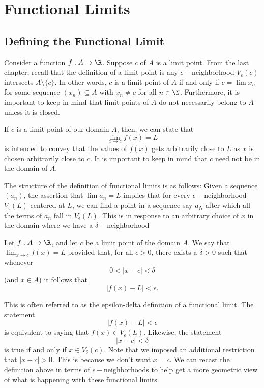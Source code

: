 \section{Functional Limits}


\subsection{Defining the Functional Limit}
Consider a function \( f: A \to \R  \). Suppose \( c  \) of \( A  \) is a limit point. From the last chapter, recall that the definition of a limit point is any \( \epsilon - \)neighborhood \( V_{\epsilon }(c) \) intersects \( A \setminus \{ c \}  \). In other words, \( c  \) is a limit point of \(  A \) if and only if \( c = \lim x_n \) for some sequence \( (x_n) \subseteq A  \) with \( x_n \neq c  \) for all \( n \in \N  \). Furthermore, it is important to keep in mind that limit points of \(  A \) do not necessarily belong to \( A  \) unless it is closed. 

If \( c  \) is a limit point of our domain \( A  \), then, we can state that 
\[ \lim_{x \to c }f(x) = L  \] is intended to convey that the values of \( f(x) \) gets arbitrarily close to \( L \) as \( x  \) is chosen arbitrarily close to \( c \). It is important to keep in mind that \( c \) need not be in the domain of \( A  \).

The structure of the definition of functional limits is as follows:
Given a sequence \( (a_n) \), the assertion that \( \lim a_n = L   \) implies that for every \( \epsilon - \)neighborhood \( V_{\epsilon }(L) \) centered at \( L \), we can find a point in a sequence say \( a_N \) after which all the terms of \( a_n \) fall in \( V_{\epsilon }(L) \). This is in response to an arbitrary choice of \( x \) in the domain where we have a \( \delta- \)neighborhood

\begin{tcolorbox}
    \begin{defn}
        Let \( f: A \to \R  \), and let \( c \) be a limit point of the domain \( A  \). We say that \( \lim_{ x \to c } f(x) = L   \) provided that, for all \( \epsilon > 0  \), there exists a \( \delta > 0  \) such that whenever 
        \[ 0 <  | x - c  | < \delta  \] (and \( x \in A  \)) it follows that 
        \[ | f(x) - L  | < \epsilon.  \]
    \end{defn}
\end{tcolorbox}

This is often referred to as the epsilon-delta definition of a functional limit. The statement
\[ | f(x) - L  | < \epsilon  \]
is equivalent to saying that \( f(x) \in V_{\epsilon }(L) \). Likewise, the statement 
\[  | x - c  | < \delta \] is true if and only if \( x \in V_{\delta}(c) \). Note that we imposed an additional restriction that \( | x - c  | > 0  \). This is because we don't want \( x = c  \). We can recast the definition above in terms of \( \epsilon- \)neighborhoods to help get a more geometric view of what is happening with these functional limits.

